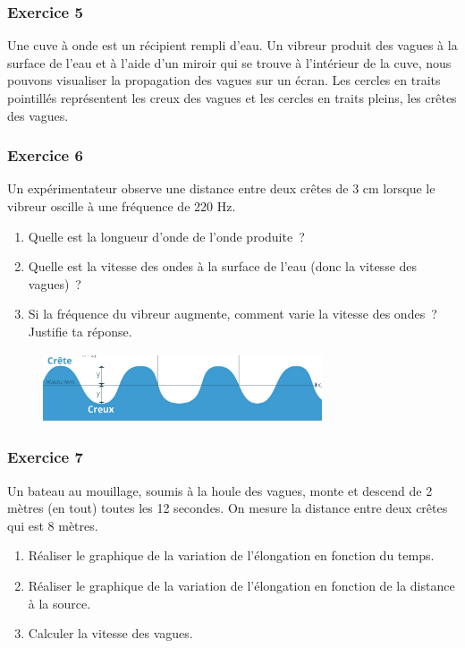 \subsubsection*{Exercice 5}

  Une cuve à onde est un récipient rempli d'eau. Un vibreur produit des
  vagues à la surface de l'eau et à l'aide d'un miroir qui se trouve à
  l'intérieur de la cuve, nous pouvons visualiser la propagation des
  vagues sur un écran. Les cercles en traits pointillés représentent les
  creux des vagues et les cercles en traits pleins, les crêtes des
  vagues.

\subsubsection*{Exercice 6}

Un expérimentateur observe une distance entre deux crêtes de 3 cm
lorsque le vibreur oscille à une fréquence de 220 Hz.
\begin{enumerate}
\item  Quelle est la longueur d'onde de l'onde produite~?
\item   Quelle est la vitesse des ondes à la surface de l'eau (donc la vitesse
  des vagues)~?
\item  Si la fréquence du vibreur augmente, comment varie la vitesse des
  ondes~? Justifie ta réponse.
\end{enumerate}

\begin{figure}
\centering
\includegraphics[width=8.255cm,height=2.046cm]{Pictures/10000001000003F1000000EBCBD13793EBF001E8.png}
\caption{}
\end{figure}

\subsubsection*{Exercice 7}

  Un bateau au mouillage, soumis à la houle des vagues, monte et descend
  de 2 mètres (en tout) toutes les 12 secondes. On mesure la distance
  entre deux crêtes qui est 8 mètres.

\begin{enumerate}
\item  Réaliser le graphique de la variation de l'élongation en fonction du
  temps.
\item  Réaliser le graphique de la variation de l'élongation en fonction de
  la distance à la source.
\item  Calculer la vitesse des vagues.
\end{enumerate}

